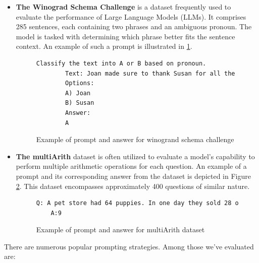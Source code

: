 \documentclass[fleqn,moreauthors,10pt]{ds_report}
\begin{document}
\begin{itemize}
    \item \textbf{The Winograd Schema Challenge} is a dataset frequently used to evaluate the performance of Large Language Models (LLMs). It comprises 285 sentences, each containing two phrases and an ambiguous pronoun. The model is tasked with determining which phrase better fits the sentence context. An example of such a prompt is illustrated in \ref{text:winogrand1}.

    \begin{figure}[htbp]
    \centering
    \begin{lstlisting}[language=TeX]
    Classify the text into A or B based on pronoun.
        Text: Joan made sure to thank Susan for all the help she had recieved.
        Options:
        A) Joan
        B) Susan
        Answer:
        A
    \end{lstlisting}
    \caption{Example of prompt and answer for winogrand schema challenge}
    \label{text:winogrand1}
    \end{figure}

    \item \textbf{The multiArith} dataset is often utilized to evaluate a model's capability to perform multiple arithmetic operations for each question. An example of a prompt and its corresponding answer from the dataset is depicted in Figure \ref{text:multArth}. This dataset encompasses approximately 400 questions of similar nature.

    \begin{figure}[htbp]
    \centering
    \begin{lstlisting}[language=TeX]
    Q: A pet store had 64 puppies. In one day they sold 28 of them and put the rest into cages with 4 in each cage. How many cages did they use? 
    A:9
    \end{lstlisting}
    \caption{Example of prompt and answer for multiArith dataset}
    \label{text:multArth}
    \end{figure}
\end{itemize}

There are numerous popular prompting strategies. Among those we've evaluated are:
\end{document}
